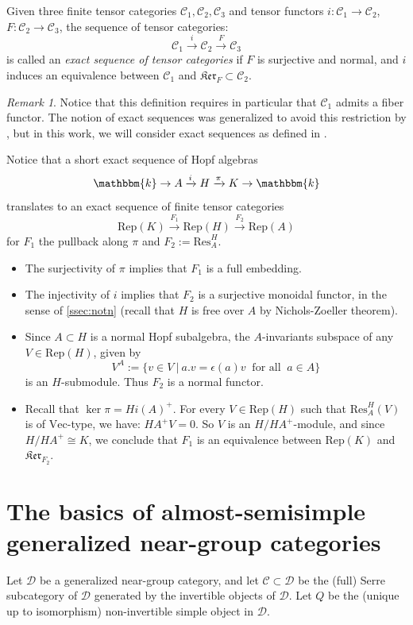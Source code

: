 \documentclass{amsart}
\theoremstyle{plain}%
\theoremstyle{remark}
\newtheorem{remark}[lemma]{Remark}
\newcommand{\C}{\mathcal{C}}
\newcommand{\1}{\mathbbm{1}}
\newcommand{\D}{\mathcal{D}}
\newcommand{\Rep}{\mathrm{Rep}}
\newcommand{\Vect}{\mathrm{Vec}}
\newcommand{\kk}{\mathbbm{k}}
\newcommand{\eps}{\epsilon}
\newcommand{\res}{\mathrm{Res}}
\begin{document}
        Given three finite tensor categories $\C_1,\C_2,\C_3$ and tensor functors $i:\C_1\to \C_2$, $F:\C_2\to \C_3$,
        the sequence of tensor categories:
        $$
            \C_1\xrightarrow{i} \C_2 \xrightarrow{F} \C_3
        $$
        is called an \textit{exact sequence of tensor categories} if $F$ is surjective and normal, and $i$ induces an equivalence between $\C_1$ and $\mathfrak{Ker}_F\subset \C_2$. 
        \begin{remark}
            Notice that this definition requires in particular that $\C_1$ admits a fiber functor. The notion of exact sequences was generalized to avoid this restriction by \cite{EG1}, but in this work, we will consider exact sequences as defined in \cite{BN}.
        \end{remark}
        Notice that a short exact sequence of Hopf algebras
        $$
            \kk\to A \xrightarrow{i} H \xrightarrow{\pi} K\to \kk
        $$
        translates to an exact sequence of finite tensor categories 
        $$
            \Rep(K) \xrightarrow{F_1} \Rep(H)\xrightarrow{F_2} \Rep(A)
        $$
        for $F_1$ the pullback along $\pi$ and $F_2:=\res_A^H$. 
        \begin{itemize}
            \item The surjectivity of $\pi$ implies that $F_1$ is a full embedding.
            \item The injectivity of $i$ implies that $F_2$ is a surjective monoidal functor, in the sense of \cref{ssec:notn} (recall that $H$ is free over $A$ by Nichols-Zoeller theorem).

            \item Since $A\subset H$ is a normal Hopf subalgebra, the $A$-invariants subspace of any $V\in \Rep(H)$, given by $$V^A:=\{v\in V~\rvert ~a.v = \eps(a)v~\text{ for all }~a\in A\}$$ is an $H$-submodule. Thus $F_2$ is a normal functor.
            \item Recall that $\ker \pi = Hi(A)^+$. For every $V\in \Rep(H)$ such that $\res_A^H(V)$ is of $\Vect$-type, we have: $HA^+ V = 0$. So $V$ is an $H/HA^+$-module, and since $H/HA^+\cong K$, we conclude that $F_1$ is an equivalence between $\Rep(K)$ and $\mathfrak{Ker}_{F_2}$.
        \end{itemize}
   
\section{The basics of almost-semisimple generalized near-group categories}\label{sec:general}
    Let $\D$ be a generalized near-group category, and let $\C\subset \D$ be the (full) Serre subcategory of $\D$ generated by the invertible objects of $\D$. Let $Q$ be the (unique up to isomorphism) non-invertible simple object in $\D$.
    
\end{document}
